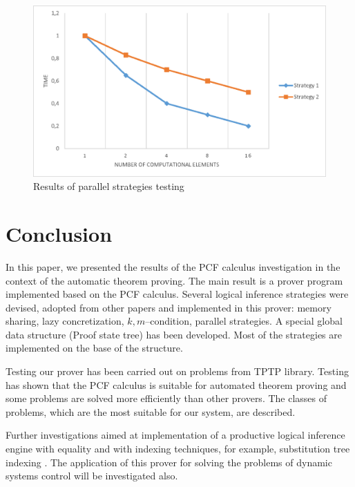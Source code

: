\documentclass[runningheads,a4paper]{llncs}
\begin{document}
\begin{figure}[h]
  \centering
  \includegraphics[width=0.8\linewidth]{img/Parallel.eps}
  \caption{Results of parallel strategies testing}
  \label{fig:parallel}
\end{figure}




\section*{Conclusion}
In this paper, we presented the results of the PCF calculus investigation in the context of the automatic theorem proving. The main result is a prover program implemented based on the PCF calculus. Several logical inference strategies were devised, adopted from other papers and implemented in this prover: memory sharing, lazy concretization, $k,m$--condition, parallel strategies. A special global data structure (Proof state tree) has been developed. Most of the strategies are implemented on the base of the structure.

Testing our prover has been carried out on problems from TPTP library. Testing has shown that the PCF calculus is suitable for automated theorem proving and some problems are solved more efficiently than other provers. The classes of problems, which are the most suitable for our system, are described.

Further investigations aimed at implementation of a productive logical inference engine with equality and with indexing techniques, for example, substitution tree indexing \cite{subtree}. The application of this prover for solving the problems of dynamic systems control will be investigated also.
\end{document}
